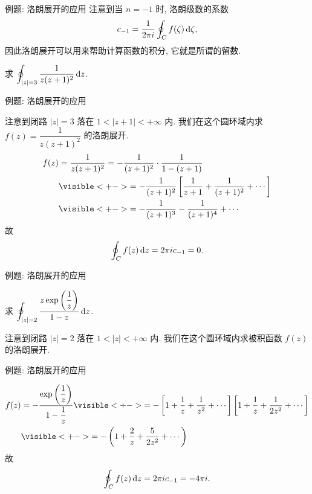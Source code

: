 \begin{frame}{例题: 洛朗展开的应用}
\onslide<+->
注意到当 $n=-1$ 时, 洛朗级数的系数
\[c_{-1}=\frac1{2\pi i}\oint_C f(\zeta)\,\mathrm{d}\zeta,\]
\onslide<+->
因此洛朗展开可以用来帮助计算函数的积分,
\onslide<+->
它就是所谓的\alert{留数}.
\begin{example}
求 $\displaystyle\oint_{|z|=3}\frac1{z(z+1)^2}\,\mathrm{d} z$.
\end{example}
\end{frame}


\begin{frame}{例题: 洛朗展开的应用}
\begin{solution}
注意到闭路 $|z|=3$ 落在 $1<|z+1|<+\infty$ 内.
\onslide<+->
我们在这个圆环域内求 $f(z)=\dfrac1{z(z+1)^2}$ 的洛朗展开.
\onslide<+->
\vspace{-\baselineskip}
\begin{align*}
f(z)&=\frac1{z(z+1)^2}=-\frac1{(z+1)^2}\cdot\frac1{1-(z+1)}\\
&\visible<+->{=-\frac1{(z+1)^2}\left[\frac1{z+1}+\frac1{(z+1)^2}+\cdots\right]}\\
&\visible<+->{=-\frac1{(z+1)^3}-\frac1{(z+1)^4}+\cdots}
\end{align*}
\onslide<+->
故
\[\oint_Cf(z)\,\mathrm{d} z=2\pi i c_{-1}=0.\]
\end{solution}
\end{frame}


\begin{frame}{例题: 洛朗展开的应用}
\begin{example}
求 $\displaystyle\oint_{|z|=2} \frac{z\exp\left(\dfrac1z\right)}{1-z}\,\mathrm{d} z$.
\end{example}
\begin{solution}
注意到闭路 $|z|=2$ 落在 $1<|z|<+\infty$ 内.
\onslide<+->
我们在这个圆环域内求被积函数 $f(z)$ 的洛朗展开.
\end{solution}
\end{frame}


\begin{frame}{例题: 洛朗展开的应用}
\begin{solutionc}
\begin{align*}
f(z)&=-\frac{\exp\left(\dfrac1z\right)}{1-\dfrac1z}
\visible<+->{=-\left[1+\frac1z+\frac1{z^2}+\cdots\right]\left[1+\frac1z+\frac1{2z^2}+\cdots\right]}\\
&\visible<+->{=-\left(1+\frac2z+\frac5{2z^2}+\cdots\right)}\end{align*}
\onslide<+->
故
\[\oint_Cf(z)\,\mathrm{d} z=2\pi i c_{-1}=-4\pi i.\]
\end{solutionc}
\end{frame}


